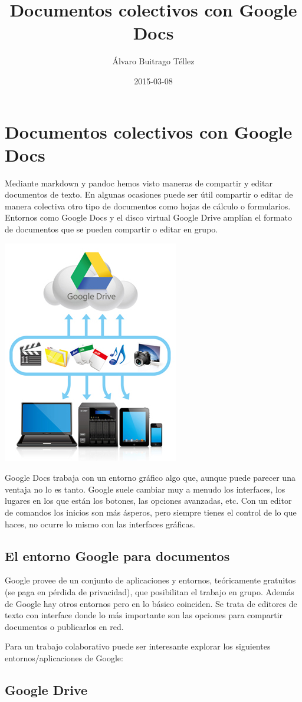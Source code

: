 \documentclass{article}
\title{Documentos colectivos con Google Docs}
\author{Álvaro Buitrago Téllez}
\date{2015-03-08}
\begin{document}
\section{Documentos colectivos con Google Docs}

Mediante markdown y pandoc hemos visto maneras de compartir y editar documentos de texto. En algunas ocasiones puede ser
útil compartir o editar de manera colectiva otro tipo de documentos como hojas de cálculo o formularios. Entornos como
Google Docs y el disco virtual Google Drive amplían el formato de documentos que se pueden compartir o editar en grupo.

\begin{center}
\includegraphics[width=0.3\linewidth]{Google_drive}
\end{center}


Google Docs trabaja con un entorno gráfico algo que, aunque puede parecer una ventaja no lo es tanto. Google suele
cambiar muy a menudo los interfaces, los lugares en los que están los botones, las opciones avanzadas, etc. Con un
editor de comandos los inicios son más ásperos, pero siempre tienes el control de lo que haces, no ocurre lo mismo con
las interfaces gráficas.

\subsection{El entorno Google para documentos}

Google provee de un conjunto de aplicaciones y entornos, teóricamente gratuitos (se paga en pérdida de privacidad), que
posibilitan el trabajo en grupo. Además de Google hay otros entornos pero en lo básico coinciden. Se trata de editores
de texto con interface donde lo más importante son las opciones para compartir documentos o publicarlos en red.

Para un trabajo colaborativo puede ser interesante explorar los siguientes entornos/aplicaciones de Google: 

\subsection{Google Drive}
\end{document}
